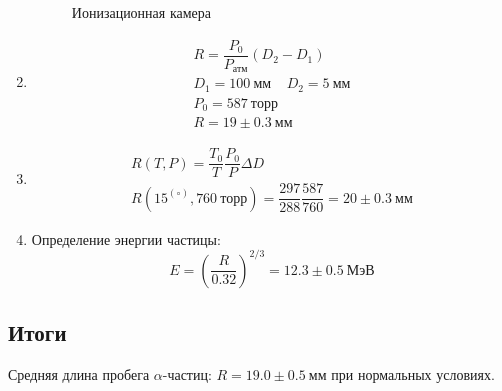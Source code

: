\documentclass{lab}
\begin{document}
\begin{enumerate}
\begin{figure}[H]
	\caption{Ионизационная камера}
	\label{graph2}
\end{figure}

\item 
\begin{gather*}
	R = \dfrac{P_0}{P_{атм}} (D_2 - D_1)\\
	D_1 = 100~мм~~~~~D_2 = 5~мм\\
	P_0 = 587~торр\\
	R = 19 \pm 0.3 ~мм
\end{gather*}

\item 
\begin{gather*}
	R(T,P) = \dfrac{T_0}{T} \dfrac{P_0}{P} \Delta D\\
	R(15^(\circ), 760~торр) = \dfrac{297}{288} \dfrac{587}{760} = 20 \pm 0.3~мм
\end{gather*}

\item 
Определение энергии частицы:
\begin{equation}
E = \left( \dfrac{R}{0.32} \right) ^{2/3} = 12.3 \pm 0.5~МэВ
\end{equation}

\end{enumerate}

\subsection*{Итоги}

Средняя длина пробега $ \alpha $-частиц: $ R = 19.0 \pm 0.5 ~ мм$ при нормальных условиях.
\end{document}
